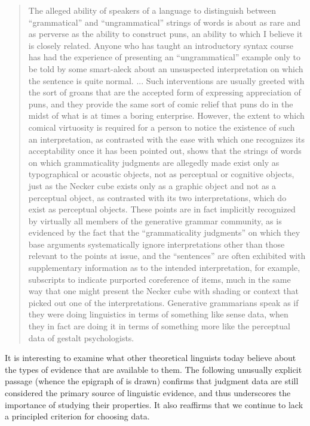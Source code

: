 \begin{quote}
The alleged ability of speakers of a language to distinguish between ``grammatical'' and ``ungrammatical'' strings of words is about as rare and as perverse as the ability to construct puns, an ability to which I believe it is closely related. Anyone who has taught an introductory syntax course has had the experience of presenting an ``ungrammatical'' example only to be told by some smart-aleck about an unsuspected interpretation on which the sentence is quite normal. ... Such interventions are usually greeted with the sort of groans that are the accepted form of expressing appreciation of puns, and they provide the same sort of comic relief that puns do in the midst of what is at times a boring enterprise. However, the extent to which comical virtuosity is required for a person to notice the existence of such an interpretation, as contrasted with the ease with which one recognizes its acceptability once it has been pointed out, shows that the strings of words on which grammaticality judgments are allegedly made exist only as typographical or acoustic objects, not as perceptual or cognitive objects, just as the Necker cube exists only as a graphic object and not as a perceptual object, as contrasted with its two interpretations, which do exist as perceptual objects. These points are in fact implicitly recognized  by virtually  all members of the generative grammar community, as is evidenced by the fact that the ``grammaticality judgments'' on which they base arguments systematically ignore interpretations other than those relevant to the points at issue, and the ``sentences'' are often exhibited with supplementary information as to the intended interpretation, for example, subscripts to indicate purported coreference of items, much in the same way that one might present the Necker cube with shading or context that picked out one of the interpretations. Generative grammarians speak as if they were doing linguistics in terms of something like sense data, when they in
fact are doing it in terms of something more like the perceptual data of gestalt psychologists.  \citep[78\textendash{}79]{McCawley1982}
\end{quote}

It is interesting to examine what other theoretical linguists today believe about the types of evidence that are available to them. The following unusually explicit passage (whence the epigraph of  is drawn) confirms that judgment data are still considered the primary source of linguistic evidence, and thus
underscores the importance of studying their properties. It also reaffirms that we continue to lack a principled criterion  for choosing data.


